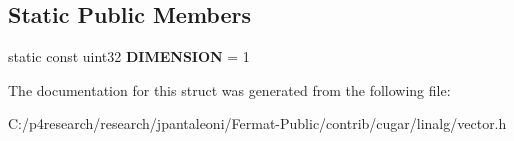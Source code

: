 \subsection*{Static Public Members}
\begin{DoxyCompactItemize}
\item 
\mbox{\label{structcugar_1_1_vector_3_01_t_00_011_01_4_a173bcfee3b03dca234439cc89056c48f}} 
static const uint32 {\bfseries D\+I\+M\+E\+N\+S\+I\+ON} = 1
\end{DoxyCompactItemize}


The documentation for this struct was generated from the following file\+:\begin{DoxyCompactItemize}
\item 
C\+:/p4research/research/jpantaleoni/\+Fermat-\/\+Public/contrib/cugar/linalg/vector.\+h\end{DoxyCompactItemize}
